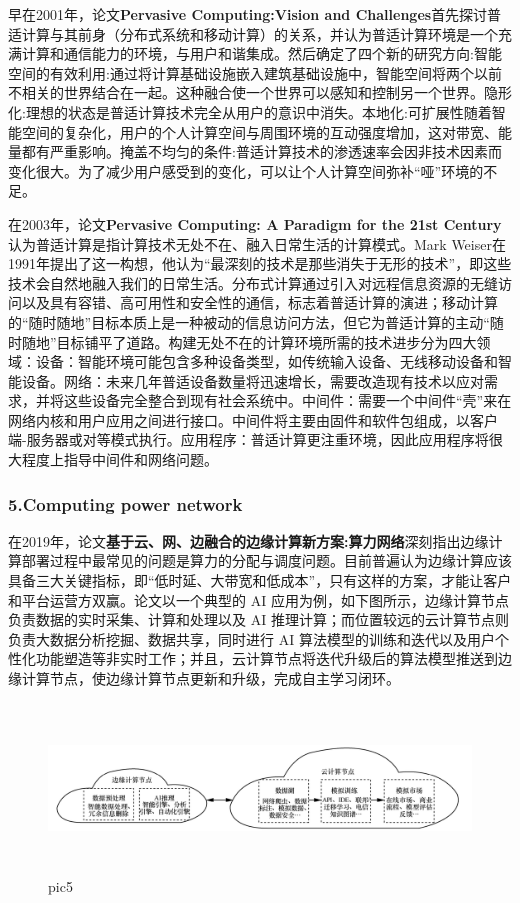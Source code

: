 \documentclass[a4paper,twoside]{scrbook}
\begin{document}
早在2001年，论文\textbf{Pervasive Computing:Vision and Challenges}首先探讨普适计算与其前身（分布式系统和移动计算）的关系，并认为普适计算环境是一个充满计算和通信能力的环境，与用户和谐集成。然后确定了四个新的研究方向:智能空间的有效利用:通过将计算基础设施嵌入建筑基础设施中，智能空间将两个以前不相关的世界结合在一起。这种融合使一个世界可以感知和控制另一个世界。隐形化:理想的状态是普适计算技术完全从用户的意识中消失。本地化:可扩展性随着智能空间的复杂化，用户的个人计算空间与周围环境的互动强度增加，这对带宽、能量都有严重影响。掩盖不均匀的条件:普适计算技术的渗透速率会因非技术因素而变化很大。为了减少用户感受到的变化，可以让个人计算空间弥补“哑”环境的不足。

在2003年，论文\textbf{Pervasive Computing: A Paradigm for the 21st Century}认为普适计算是指计算技术无处不在、融入日常生活的计算模式。Mark Weiser在1991年提出了这一构想，他认为“最深刻的技术是那些消失于无形的技术”，即这些技术会自然地融入我们的日常生活。分布式计算通过引入对远程信息资源的无缝访问以及具有容错、高可用性和安全性的通信，标志着普适计算的演进；移动计算的“随时随地”目标本质上是一种被动的信息访问方法，但它为普适计算的主动“随时随地”目标铺平了道路。构建无处不在的计算环境所需的技术进步分为四大领域：设备：智能环境可能包含多种设备类型，如传统输入设备、无线移动设备和智能设备。网络：未来几年普适设备数量将迅速增长，需要改造现有技术以应对需求，并将这些设备完全整合到现有社会系统中。中间件：需要一个中间件“壳”来在网络内核和用户应用之间进行接口。中间件将主要由固件和软件包组成，以客户端-服务器或对等模式执行。应用程序：普适计算更注重环境，因此应用程序将很大程度上指导中间件和网络问题。


\subsubsection{5.Computing power network}

在2019年，论文\textbf{基于云、网、边融合的边缘计算新方案:算力网络}深刻指出边缘计算部署过程中最常见的问题是算力的分配与调度问题。目前普遍认为边缘计算应该具备三大关键指标，即“低时延、大带宽和低成本”，只有这样的方案，才能让客户和平台运营方双赢。论文以一个典型的 AI 应用为例，如下图所示，边缘计算节点负责数据的实时采集、计算和处理以及 AI 推理计算；而位置较远的云计算节点则负责大数据分析挖掘、数据共享，同时进行 AI 算法模型的训练和迭代以及用户个性化功能塑造等非实时工作；并且，云计算节点将迭代升级后的算法模型推送到边缘计算节点，使边缘计算节点更新和升级，完成自主学习闭环。
\begin{figure}
\centering %
\includegraphics[height=4.5cm,width=13.5cm]{AI c e.png}
\caption{pic5}
\end{figure}
\end{document}

